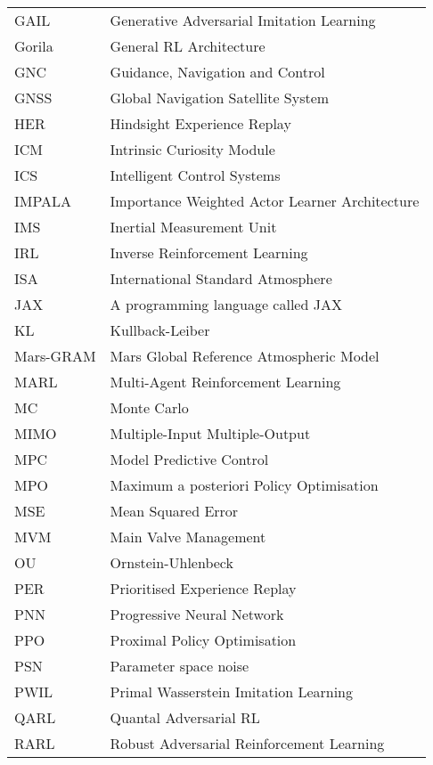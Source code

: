 \begin{longtable}{p{2.5cm}p{12cm}}
    GAIL & Generative Adversarial Imitation Learning \\ %
    Gorila & General RL Architecture \\ %
    GNC & Guidance, Navigation and Control \\ %
    GNSS & Global Navigation Satellite System \\ %
    HER & Hindsight Experience Replay \\ %
    ICM & Intrinsic Curiosity Module \\ %
    ICS & Intelligent Control Systems \\ %
    IMPALA & Importance Weighted Actor Learner Architecture \\ %
    IMS & Inertial Measurement Unit \\ %
    IRL & Inverse Reinforcement Learning \\ %
    ISA & International Standard Atmosphere \\ %
    JAX & A programming language called JAX \\ %
    KL & Kullback-Leiber \\ %
    Mars-GRAM & Mars Global Reference Atmospheric Model \\ %
    MARL & Multi-Agent Reinforcement Learning \\ %
    MC & Monte Carlo \\ %
    MIMO & Multiple-Input Multiple-Output \\ %
    MPC & Model Predictive Control \\ %
    MPO & Maximum a posteriori Policy Optimisation \\ %
    MSE & Mean Squared Error \\ %
    MVM & Main Valve Management \\ %
    OU & Ornstein-Uhlenbeck \\ %
    PER & Prioritised Experience Replay \\ %
    PNN & Progressive Neural Network \\ %
    PPO & Proximal Policy Optimisation \\ %
    PSN & Parameter space noise \\ %
    PWIL & Primal Wasserstein Imitation Learning \\ %
    QARL & Quantal Adversarial RL \\ %
    RARL & Robust Adversarial Reinforcement Learning \\ %

\end{longtable}
